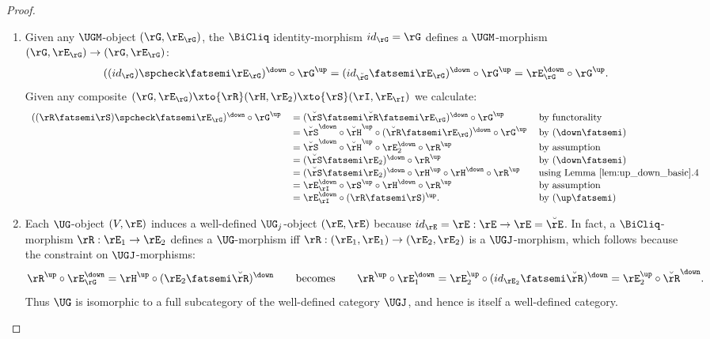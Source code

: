 \documentclass{article}
\begin{document}
\begin{proof}
\begin{enumerate}
\item
Given any $\UGM$-object $(\rG,\rE_\rG)$, the $\BiCliq$ identity-morphism $id_\rG = \rG$ defines a $\UGM$-morphism $(\rG,\rE_\rG) \to (\rG,\rE_\rG)$:
\[
((id_\rG)\spcheck \fatsemi \rE_\rG)^\down \circ \rG^\up
= (id_{\breve{\rG}} \fatsemi \rE_\rG)^\down \circ \rG^\up
= \rE_\rG^\down \circ \rG^\up.
\]
Given any composite $(\rG,\rE_\rG) \xto{\rR} (\rH,\rE_2) \xto{\rS} (\rI,\rE_\rI)$ we calculate:
\[
\begin{tabular}{lll}
$((\rR \fatsemi \rS)\spcheck \fatsemi \rE_\rG)^\down \circ \rG^\up$
&
$= (\breve{\rS} \fatsemi \breve{\rR} \fatsemi \rE_\rG)^\down \circ \rG^\up$
& by functorality
\\&
$=  \breve{\rS}^\down \circ \breve{\rH}^\up \circ (\breve{\rR}\fatsemi \rE_\rG)^\down \circ \rG^\up$
& by $(\down\fatsemi)$
\\&
$= \breve{\rS}^\down \circ \breve{\rH}^\up \circ \rE_2^\down \circ \rR^\up$
& by assumption
\\&
$= (\breve{\rS} \fatsemi \rE_2)^\down \circ \rR^\up$
& by $(\down\fatsemi)$
\\&
$= (\breve{\rS} \fatsemi \rE_2)^\down \circ \rH^\up \circ \rH^\down \circ \rR^\up$
& using Lemma \ref{lem:up_down_basic}.4
\\&
$= \rE_\rI^\down \circ \rS^\up \circ \rH^\down \circ \rR^\up$
& by assumption
\\&
$= \rE_\rI^\down \circ (\rR \fatsemi \rS)^\up$.
& by $(\up\fatsemi)$
\end{tabular}
\]


\item
Each $\UG$-object $(V,\rE)$ induces a well-defined $\UG_j$-object $(\rE,\rE)$ because $id_\rE = \rE : \rE \to \rE = \breve{\rE}$. In fact, a $\BiCliq$-morphism $\rR : \rE_1 \to \rE_2$ defines a $\UG$-morphism iff $\rR : (\rE_1,\rE_1) \to (\rE_2,\rE_2)$ is a $\UGJ$-morphism, which follows because the constraint on $\UGJ$-morphisms:
\[
\rR^\up \circ \rE_\rG^\down = \rH^\up \circ (\rE_2 \fatsemi \breve{\rR})^\down
\qquad\text{becomes}\qquad
\rR^\up \circ \rE_1^\down = \rE_2^\up \circ (id_{\rE_2} \fatsemi \breve{\rR})^\down = \rE_2^\up \circ \breve{\rR}^\down.
\]
Thus $\UG$ is isomorphic to a full subcategory of the well-defined category $\UGJ$, and hence is itself a well-defined category.
\end{enumerate}
\end{proof}


\smallskip
\end{document}
